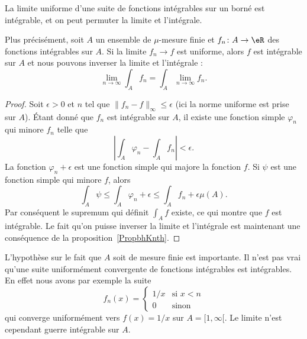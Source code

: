 \begin{theorem}			\label{ThoUnifCvIntRiem}
	La limite uniforme d'une suite de fonctions intégrables sur un borné est intégrable, et on peut permuter la limite et l'intégrale.

	Plus précisément, soit \( A\) un ensemble de \( \mu\)-mesure finie et \( f_n\colon A\to \eR\) des fonctions intégrables sur \( A\). Si la limite \( f_n\to f\) est uniforme, alors \( f\) est intégrable sur \( A\) et nous pouvons inverser la limite et l'intégrale :
	\begin{equation}
		\lim_{n\to \infty} \int_A f_n=\int_A\lim_{n\to \infty} f_n.
	\end{equation}
\end{theorem}

\begin{proof}
	Soit \( \epsilon>0\) et \( n\) tel que \( \| f_n-f \|_{\infty}\leq \epsilon\) (ici la norme uniforme est prise sur \( A\)). Étant donné que \( f_n\) est intégrable sur \( A\), il existe une fonction simple \( \varphi_n\) qui minore \( f_n\) telle que
	\begin{equation}
		\left| \int_{A}\varphi_n-\int_A f_n \right| <\epsilon.
	\end{equation}
	La fonction \( \varphi_n+\epsilon\) est une fonction simple qui majore la fonction \( f\). Si \( \psi\) est une fonction simple qui minore \( f\), alors
	\begin{equation}
		\int_A\psi\leq\int_A\varphi_n+\epsilon\leq\int_A f_n+\epsilon\mu(A).
	\end{equation}
	Par conséquent le supremum qui définit \( \int_A f\) existe, ce qui montre que \( f\) est intégrable. Le fait qu'on puisse inverser la limite et l'intégrale est maintenant une conséquence de la proposition~\ref{PropbhKnth}.
\end{proof}

\begin{remark}
	L'hypothèse sur le fait que \( A\) soit de mesure finie est importante. Il n'est pas vrai qu'une suite uniformément convergente de fonctions intégrables est intégrables. En effet nous avons par exemple la suite
	\begin{equation}
		f_n(x)=\begin{cases}
			1/x & \text{si } x<n \\
			0   & \text{sinon}
		\end{cases}
	\end{equation}
	qui converge uniformément vers \( f(x)=1/x\) sur \( A=\mathopen[ 1 , \infty [\). Le limite n'est cependant guerre intégrable sur \( A\).
\end{remark}

